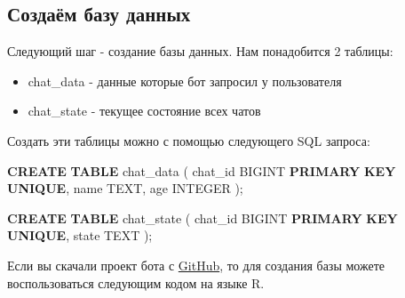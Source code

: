 \documentclass[
]{book}
\newenvironment{Shaded}{\begin{snugshade}}{\end{snugshade}}
\newcommand{\DataTypeTok}[1]{\textcolor[rgb]{0.13,0.29,0.53}{#1}}
\newcommand{\KeywordTok}[1]{\textcolor[rgb]{0.13,0.29,0.53}{\textbf{#1}}}
\newcommand{\NormalTok}[1]{#1}
\providecommand{\tightlist}{%
  \setlength{\itemsep}{0pt}\setlength{\parskip}{0pt}}
\begin{document}
\subsection{Создаём базу данных}\label{ux441ux43eux437ux434ux430ux451ux43c-ux431ux430ux437ux443-ux434ux430ux43dux43dux44bux445}

Следующий шаг - создание базы данных. Нам понадобится 2 таблицы:

\begin{itemize}
\tightlist
\item
  chat\_data - данные которые бот запросил у пользователя
\item
  chat\_state - текущее состояние всех чатов
\end{itemize}

Создать эти таблицы можно с помощью следующего SQL запроса:

\begin{Shaded}
\begin{Highlighting}[]
\KeywordTok{CREATE} \KeywordTok{TABLE}\NormalTok{ chat\_data (}
\NormalTok{    chat\_id BIGINT  }\KeywordTok{PRIMARY} \KeywordTok{KEY}
                    \KeywordTok{UNIQUE}\NormalTok{,}
\NormalTok{    name    TEXT,}
\NormalTok{    age     }\DataTypeTok{INTEGER}
\NormalTok{);}

\KeywordTok{CREATE} \KeywordTok{TABLE}\NormalTok{ chat\_state (}
\NormalTok{    chat\_id BIGINT }\KeywordTok{PRIMARY} \KeywordTok{KEY}
                   \KeywordTok{UNIQUE}\NormalTok{,}
\NormalTok{    state   TEXT}
\NormalTok{);}
\end{Highlighting}
\end{Shaded}

Если вы скачали проект бота с \href{https://github.com/selesnow/logical_tg_bot/archive/master.zip}{GitHub}, то для создания базы можете воспользоваться следующим кодом на языке R.
\end{document}
